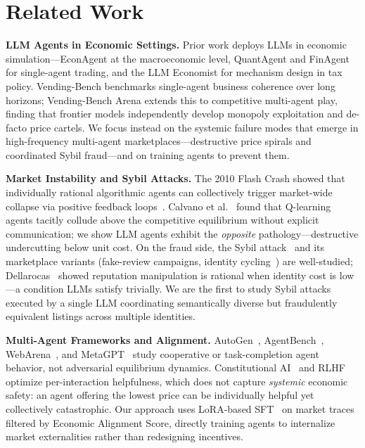 \section{Related Work}
\label{related}

\textbf{LLM Agents in Economic Settings.}
Prior work deploys LLMs in economic simulation---EconAgent \citep{li2024econagent} at the macroeconomic level, QuantAgent \citep{wang2024quantagent} and FinAgent \citep{zhang2024finagent} for single-agent trading, and the LLM Economist \citep{karten2025llm} for mechanism design in tax policy.
Vending-Bench \citep{backlund2025vendingbenchbenchmarklongtermcoherence} benchmarks single-agent business coherence over long horizons; Vending-Bench Arena \citep{vendingbencharena2025} extends this to competitive multi-agent play, finding that frontier models independently develop monopoly exploitation and de-facto price cartels.
We focus instead on the systemic failure modes that emerge in high-frequency multi-agent marketplaces---destructive price spirals and coordinated Sybil fraud---and on training agents to prevent them.

\textbf{Market Instability and Sybil Attacks.}
The 2010 Flash Crash showed that individually rational algorithmic agents can collectively trigger market-wide collapse via positive feedback loops~\citep{kirilenko2017flash,farmer2009economy,johnson2013abrupt}.
Calvano et al.~\citep{calvano2020artificial} found that Q-learning agents tacitly collude above the competitive equilibrium without explicit communication; we show LLM agents exhibit the \textit{opposite} pathology---destructive undercutting below unit cost.
On the fraud side, the Sybil attack~\citep{douceur2002sybil} and its marketplace variants (fake-review campaigns, identity cycling~\citep{luca2016fake,mayzlin2014promotional}) are well-studied; Dellarocas~\citep{dellarocas2006strategic} showed reputation manipulation is rational when identity cost is low---a condition LLMs satisfy trivially.
We are the first to study Sybil attacks executed by a single LLM coordinating semantically diverse but fraudulently equivalent listings across multiple identities.

\textbf{Multi-Agent Frameworks and Alignment.}
AutoGen~\citep{wu2023autogen}, AgentBench~\citep{liu2023agentbench}, WebArena~\citep{zhou2023webarena}, and MetaGPT~\citep{hong2023metagpt} study cooperative or task-completion agent behavior, not adversarial equilibrium dynamics.
Constitutional AI~\citep{bai2022constitutional} and RLHF~\citep{ouyang2022training} optimize per-interaction helpfulness, which does not capture \textit{systemic} economic safety: an agent offering the lowest price can be individually helpful yet collectively catastrophic.
Our approach uses LoRA-based SFT~\citep{hu2022lora} on market traces filtered by Economic Alignment Score, directly training agents to internalize market externalities rather than redesigning incentives.
